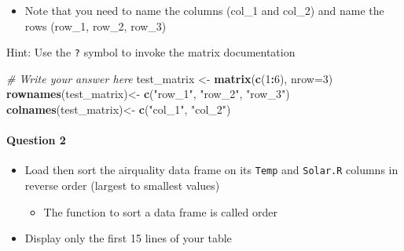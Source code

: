 \documentclass[
]{article}
\newenvironment{Shaded}{\begin{snugshade}}{\end{snugshade}}
\newcommand{\CommentTok}[1]{\textcolor[rgb]{0.56,0.35,0.01}{\textit{#1}}}
\newcommand{\DataTypeTok}[1]{\textcolor[rgb]{0.13,0.29,0.53}{#1}}
\newcommand{\DecValTok}[1]{\textcolor[rgb]{0.00,0.00,0.81}{#1}}
\newcommand{\KeywordTok}[1]{\textcolor[rgb]{0.13,0.29,0.53}{\textbf{#1}}}
\newcommand{\NormalTok}[1]{#1}
\newcommand{\OperatorTok}[1]{\textcolor[rgb]{0.81,0.36,0.00}{\textbf{#1}}}
\newcommand{\OtherTok}[1]{\textcolor[rgb]{0.56,0.35,0.01}{#1}}
\newcommand{\StringTok}[1]{\textcolor[rgb]{0.31,0.60,0.02}{#1}}
\providecommand{\tightlist}{%
  \setlength{\itemsep}{0pt}\setlength{\parskip}{0pt}}
\begin{document}
\begin{itemize}
\tightlist
\item
  Note that you need to name the columns (col\_1 and col\_2) and name
  the rows (row\_1, row\_2, row\_3)
\end{itemize}

Hint: Use the \texttt{?} symbol to invoke the matrix documentation

\begin{Shaded}
\begin{Highlighting}[]
\CommentTok{# Write your answer here}
\NormalTok{test_matrix <-}\StringTok{ }\KeywordTok{matrix}\NormalTok{(}\KeywordTok{c}\NormalTok{(}\DecValTok{1}\OperatorTok{:}\DecValTok{6}\NormalTok{), }\DataTypeTok{nrow=}\DecValTok{3}\NormalTok{)}
\KeywordTok{rownames}\NormalTok{(test_matrix)<-}\StringTok{ }\KeywordTok{c}\NormalTok{(}\StringTok{"row_1"}\NormalTok{, }\StringTok{"row_2"}\NormalTok{, }\StringTok{"row_3"}\NormalTok{)}
\KeywordTok{colnames}\NormalTok{(test_matrix)<-}\StringTok{ }\KeywordTok{c}\NormalTok{(}\StringTok{"col_1"}\NormalTok{, }\StringTok{"col_2"}\NormalTok{)}
\end{Highlighting}
\end{Shaded}

\hypertarget{question-2}{%
\paragraph{Question 2}\label{question-2}}

\begin{itemize}
\tightlist
\item
  Load then sort the airquality data frame on its \texttt{Temp} and
  \texttt{Solar.R} columns in reverse order (largest to smallest values)

  \begin{itemize}
  \tightlist
  \item
    The function to sort a data frame is called order
  \end{itemize}
\item
  Display only the first 15 lines of your table
\end{itemize}

\begin{Shaded}
\end{Shaded}
\end{document}
